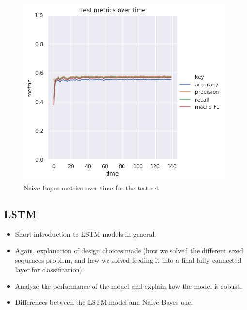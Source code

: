 \documentclass[12pt]{report}
\begin{document}
\begin{figure}[H]
\centering
\includegraphics[width=0.8\linewidth]{assets/framework/nb_BERT_test_metrics_holdout.png}
\caption{Naive Bayes metrics over time for the test set}
\label{fig:nb-metrics}
\end{figure}

\subsection{LSTM}

\begin{itemize}
    \item Short introduction to LSTM models in general.
    \item Again, explanation of design choices made (how we solved the different sized sequences problem, and how we solved feeding it into a final fully connected layer for classification).
    \item Analyze the performance of the model and explain how the model is robust.
    \item Differences between the LSTM model and Naive Bayes one.
\end{itemize}
\end{document}

